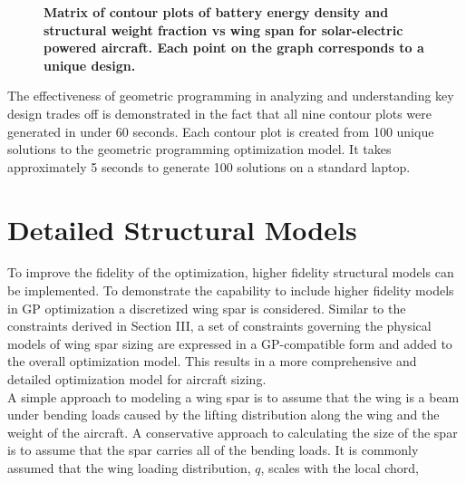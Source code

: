 \documentclass[]{aiaa-tc}%
\begin{document}
 \begin{figure}[H]
 \begin{subfigmatrix}{3}%
 \end{subfigmatrix}
 \caption{ \textbf{Matrix of contour plots of battery energy density and structural weight fraction vs wing span for solar-electric powered aircraft. Each point on the graph corresponds to a unique design.} }
 \label{f:solarcontours}
\end{figure}

The effectiveness of geometric programming in analyzing and understanding key design trades off is demonstrated in the fact that all nine contour plots were generated in under 60 seconds. Each contour plot is created from 100 unique solutions to the geometric programming optimization model.  It takes approximately 5 seconds to generate 100 solutions on a standard laptop.

\section{Detailed Structural Models}

To improve the fidelity of the optimization, higher fidelity structural models can be implemented.  To demonstrate the capability to include higher fidelity models in GP optimization a discretized wing spar is considered. 
Similar to the constraints derived in Section III, a set of constraints governing the physical models of wing spar sizing are expressed in a GP-compatible form and added to the overall optimization model.  
This results in a more comprehensive and detailed optimization model for aircraft sizing.   \\

A simple approach to modeling a wing spar is to assume that the wing is a beam under bending loads caused by the lifting distribution along the wing and the weight of the aircraft. A conservative approach to calculating the size of the spar is to assume that the spar carries all of the bending loads.  It is commonly assumed that the wing loading distribution, $q$, scales with the local chord,\cite{bending}
\end{document}
